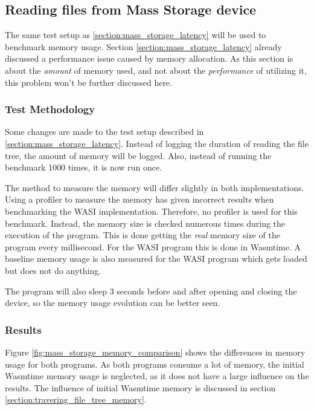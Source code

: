 \subsection{Reading files from Mass Storage device}
\label{section:reading_files_memory}
The same test setup as \ref{section:mass_storage_latency} will be used to benchmark memory usage. Section \ref{section:mass_storage_latency} already discussed a performance issue caused by memory allocation. As this section is about the \textit{amount} of memory used, and not about the \textit{performance} of utilizing it, this problem won't be further discussed here.

\subsubsection{Test Methodology}
\label{section:reading_files_memory_test_setup}
Some changes are made to the test setup described in \ref{section:mass_storage_latency}. Instead of logging the duration of reading the file tree, the amount of memory will be logged. Also, instead of running the benchmark 1000 times, it is now run once.

The method to measure the memory will differ slightly in both implementations. Using a profiler to measure the memory has given incorrect results when benchmarking the \acrshort{WASI} implementation. Therefore, no profiler is used for this benchmark. Instead, the memory size is checked numerous times during the execution of the program. This is done getting the \textit{real} memory size of the program every millisecond. For the \acrshort{WASI} program this is done in Wasmtime. A baseline memory usage is also measured for the \acrshort{WASI} program which gets loaded but does not do anything.

The program will also sleep 3 seconds before and after opening and closing the device, so the memory usage evolution can be better seen.

\subsubsection{Results} 

Figure \ref{fig:mass_storage_memory_comparison} shows the differences in memory usage for both programs. As both programs consume a lot of memory, the initial Wasmtime memory usage is neglected, as it does not have a large influence on the results. The influence of initial Wasmtime memory is discussed in section \ref{section:travering_file_tree_memory}.

